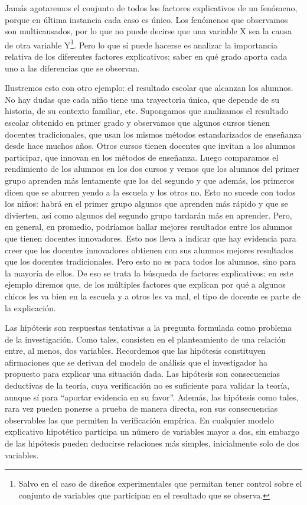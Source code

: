 \documentclass[]{book}
\let\rmarkdownfootnote\footnote%
\def\footnote{\protect\rmarkdownfootnote}
\begin{document}
Jamás agotaremos el conjunto de todos los factores explicativos de un
fenómeno, porque en última instancia cada caso es único. Los fenómenos que observamos son multicausados, por lo que no puede decirse que una
variable X sea la causa de otra variable Y\footnote{Salvo en el caso de diseños experimentales que permitan tener control sobre el conjunto de variables que participan en el resultado que se observa.}. Pero lo que sí
puede hacerse es analizar la importancia relativa de los diferentes
factores explicativos; saber en qué grado aporta cada uno a las
diferencias que se observan.

Ilustremos esto con otro ejemplo: el resultado escolar que alcanzan los alumnos. No hay dudas que cada niño tiene una trayectoria única, que depende de su historia, de su contexto familiar, etc. Supongamos que analizamos el resultado escolar obtenido en primer grado y observamos que algunos cursos tienen docentes tradicionales, que usan los mismos métodos estandarizados de enseñanza desde hace muchos años. Otros cursos tienen docentes que invitan a los alumnos participar, que innovan en los métodos de enseñanza. Luego comparamos el rendimiento de los alumnos en los dos cursos y vemos que los alumnos del primer grupo aprenden más lentamente que los del segundo y que además, los primeros dicen que se aburren yendo a la escuela y los otros no. Esto no sucede con todos los niños: habrá en el primer grupo algunos que aprenden más rápido y que se divierten, así como algunos del segundo grupo tardarán más en aprender. Pero, en general, en promedio, podríamos hallar mejores resultados entre los alumnos que tienen docentes innovadores. Esto nos lleva a indicar que hay evidencia para creer que los docentes innovadores obtienen con sus alumnos mejores resultados que los docentes tradicionales. Pero esto
no es para todos los alumnos, sino para la mayoría de ellos. De eso se trata la búsqueda de factores explicativos: en este ejemplo diremos que, de los múltiples factores que explican por qué a algunos chicos les va bien en la escuela y a otros les va mal, el tipo de docente es parte de la explicación.

Las hipótesis son respuestas tentativas a la pregunta formulada como
problema de la investigación. Como tales, consisten en el planteamiento de una relación entre, al menos, dos variables. Recordemos que las hipótesis constituyen afirmaciones que se derivan del modelo de análisis que el investigador ha propuesto para explicar una situación dada. Las hipótesis son consecuencias deductivas de la teoría, cuya verificación no es suficiente para validar la teoría, aunque sí para ``aportar evidencia en su favor''. Además, las hipótesis como tales, rara vez pueden ponerse a prueba de manera directa, son sus consecuencias observables las que permiten la verificación empírica. En cualquier modelo explicativo hipotético participa un número de variables mayor a dos, sin embargo de las hipótesis pueden deducirse relaciones más simples, inicialmente solo de dos variables.
\end{document}
